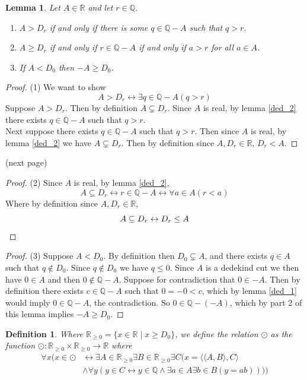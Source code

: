 \documentclass{report}
\newtheorem{lemma}[theo]{Lemma}
\newtheorem{definition}[theo]{Definition}
\begin{document}
\begin{lemma}\label{ded_3}
Let $A\in\mathbb R$ and let $r\in\mathbb Q$.
\begin{enumerate}
\item $A>D_r$ if and only if there is some $q\in\mathbb Q-A$ such that $q>r$.
\item $A\geq D_r$ if and only if $r\in\mathbb Q-A$ if and only if $a>r$ for all $a\in A$.
\item If $A<D_0$ then $-A\geq D_0$.
\end{enumerate}
\end{lemma}
\begin{proof}(1)
We want to show
\begin{equation*}
A>D_r\leftrightarrow\exists q\in\mathbb Q-A(q>r)
\end{equation*}
Suppose $A>D_r$. Then by definition $A\subsetneq D_r$.
Since $A$ is real, by lemma \ref{ded_2} 
there exists $q\in\mathbb Q-A$ such that $q>r$.\\
\indent Next suppose there exists $q\in\mathbb Q-A$ such that $q>r$.
Then since $A$ is real, by lemma \ref{ded_2} we have $A\subsetneq D_r$. Then by definition
since $A,D_r\in\mathbb R$, $D_r<A$.
\end{proof}
\noindent(next page)\newpage
\begin{proof}(2)
Since $A$ is real, by lemma \ref{ded_2},
\begin{equation*}
A\subseteq D_r\leftrightarrow r\in\mathbb Q-A\leftrightarrow\forall a\in A(r<a)
\end{equation*}
Where by definition since $A,D_r\in\mathbb R$,
\begin{equation*}
A\subseteq D_r\leftrightarrow D_r\leq A\qedhere
\end{equation*}
\end{proof}
\begin{proof}(3)
Suppose $A<D_0$. By definition then $D_0\subsetneq A$, and there exists $q\in A$ such that $q\notin D_0$. Since $q\notin D_0$ we have $q\leq0$. Since $A$ is a dedekind cut we
then have $0\in A$ and then $0\notin\mathbb Q-A$.
Suppose for contradiction that $0\in-A$. Then by definition
there exists $c\in\mathbb Q-A$ such that $0=-0<c$, which by lemma \ref{ded_1} would imply $0\in\mathbb Q-A$, the contradiction. 
So $0\in\mathbb Q-(-A)$, which by part 2 of this lemma implies $-A\geq D_0$.
\end{proof}
\begin{definition}
Where $\mathbb R_{\geq0}=\{x\in\mathbb R\mid x\geq D_0\}$,
we define the relation $\odot$ as the function $\odot:\mathbb R_{\geq0}\times\mathbb R_{\geq0}\to\mathbb R$ where
\begin{align*}
\forall x(x\in\odot&\leftrightarrow\exists A\in\mathbb R_{\geq0}\exists B\in\mathbb R_{\geq0}
\exists C(
x=\langle\langle A,B\rangle,C\rangle\\
&\land\forall y(y\in C\leftrightarrow y\in\mathbb Q\land\exists a\in A\exists b\in B(y=ab))))
\end{align*}
\end{definition}
\end{document}
